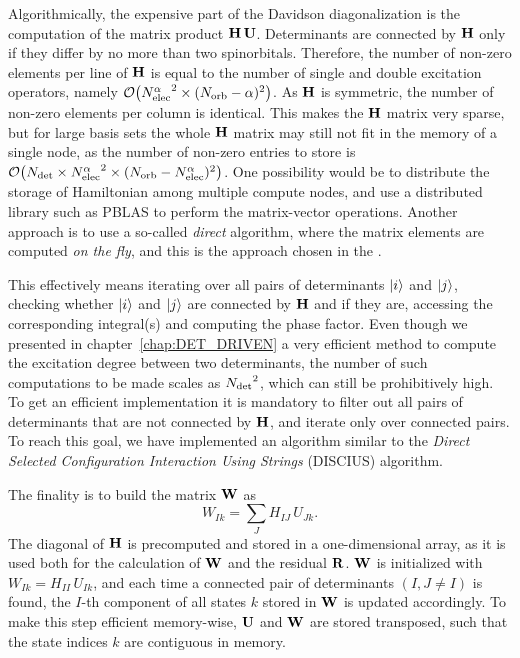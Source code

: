 \documentclass[./thesis.tex]{subfiles}
\begin{document}
Algorithmically, the expensive part of the Davidson diagonalization is the computation of the matrix product $\mathbf{H}\, \mathbf{U}$.
Determinants are connected by $\mathbf{H}$ only if they differ by no more than two
spinorbitals. Therefore, the number of non-zero elements per line of $\mathbf{H}$ is
equal to the number of single and double excitation operators, namely
$\order{\Nalpha^2 \times (\Norb - \alpha)^2}$. As $\mathbf{H}$ is symmetric, the number
of non-zero elements per column is identical. This makes the $\mathbf{H}$ matrix very
sparse, but for large basis sets the whole $\mathbf{H}$ matrix may still not fit in the
memory of a single node, as the number of non-zero entries to store is
$\order{\Ndet \times \Nalpha^2 \times (\Norb - \Nalpha)^2}$.  One possibility
would be to distribute the storage of Hamiltonian among multiple compute nodes,
and use a distributed library such as PBLAS\cite{pblas} to perform the
matrix-vector operations. Another approach is to use a so-called \emph{direct}
algorithm, where the matrix elements are computed \emph{on the fly}, and this
is the approach chosen in the \QP.


This effectively means iterating over all pairs of determinants ${\ket{i}}$ and
${\ket{j}}$, checking whether ${\ket{i}}$ and ${\ket{j}}$ are connected by $\mathbf{H}$ and if they are,
accessing the corresponding integral(s) and computing the phase factor.  Even
though we presented in chapter~\ref{chap:DET_DRIVEN} a very efficient method to
compute the excitation degree
between two determinants, the number of such computations to be made scales as
${N_\text{det}}^2$, which can still be prohibitively high. To get an efficient
implementation it is mandatory to filter out all pairs of determinants that are
not connected by $\mathbf{H}$, and iterate only over connected pairs. To reach this
goal, we have implemented an algorithm similar to the \emph{Direct Selected
Configuration Interaction Using Strings} (DISCIUS)
algorithm.\cite{Povill_1995}

The finality is to build the matrix $\mathbf{W}$ as
\begin{equation}
W_{Ik} = \sum_J H_{IJ}\, U_{Jk}.
\label{eq:whu}
\end{equation}
The diagonal of $\mathbf{H}$ is precomputed and stored in a one-dimensional array, as it is
used both for the calculation of $\mathbf{W}$ and the residual $\mathbf{R}$.
$\mathbf{W}$ is initialized with $W_{Ik} = H_{II}\, U_{Ik}$, and
each time a connected pair of determinants $(I, J \neq I)$ is found, the $I$-th component of all states $k$ stored in $\mathbf{W}$ is updated accordingly. To make this step efficient memory-wise, $\mathbf{U}$ and $\mathbf{W}$ are stored transposed, such that the state indices $k$ are contiguous in memory.
\end{document}
